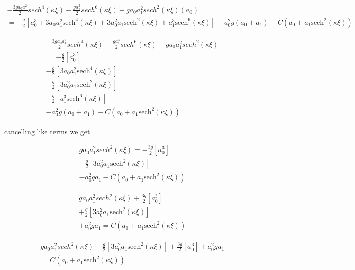 \documentclass[subeqn]{article}
\begin{document}
\begin{multline*}
- \frac{3ga_0a_1^2 }{2} sech^4(\kappa \xi)
- \frac{ga_1^3 }{2} sech^6(\kappa \xi) 
+ ga_0a_1^2  sech^2(\kappa \xi) \left(a_0 \right)\\
= {-\frac{g}{2} \left[a_0^3 + 3a_0a_1^2\text{sech}^4\left( \kappa \xi\right) + 3a_0^2a_1\text{sech}^2\left( \kappa \xi\right) + a_1^3\text{sech}^6\left( \kappa \xi\right)   \right] - a_0^2 g \left(a_0 + a_1\right) - C \left(a_0 + a_1\text{sech}^2\left( \kappa \xi\right) \right)}
\end{multline*}

\begin{multline*}
- \frac{3ga_0a_1^2 }{2} sech^4(\kappa \xi)
- \frac{ga_1^3 }{2} sech^6(\kappa \xi) 
+ ga_0a_1^2  sech^2(\kappa \xi) \\
= -\frac{g}{2} \left[a_0^3   \right] \\
-\frac{g}{2} \left[ 3a_0a_1^2\text{sech}^4\left( \kappa \xi\right) \right] \\
-\frac{g}{2} \left[3a_0^2a_1\text{sech}^2\left( \kappa \xi\right) \right] \\
-\frac{g}{2} \left[ a_1^3\text{sech}^6\left( \kappa \xi\right)   \right] \\
 - a_0^2 g \left(a_0 + a_1\right) - C \left(a_0 + a_1\text{sech}^2\left( \kappa \xi\right) \right)
\end{multline*}

cancelling like terms we get

\begin{multline*}
ga_0a_1^2  sech^2(\kappa \xi) = -\frac{3g}{2} \left[a_0^3   \right] \\
-\frac{g}{2} \left[3a_0^2a_1\text{sech}^2\left( \kappa \xi\right) \right] \\
- a_0^2 g a_1 - C \left(a_0 + a_1\text{sech}^2\left( \kappa \xi\right) \right)
\end{multline*}

\begin{multline*}
ga_0a_1^2  sech^2(\kappa \xi)  +\frac{3g}{2} \left[a_0^3   \right] \\
+\frac{g}{2} \left[3a_0^2a_1\text{sech}^2\left( \kappa \xi\right) \right] \\
+ a_0^2 g a_1  =  C \left(a_0 + a_1\text{sech}^2\left( \kappa \xi\right) \right)
\end{multline*}

\begin{multline*}
ga_0a_1^2  sech^2(\kappa \xi) +\frac{g}{2} \left[3a_0^2a_1\text{sech}^2\left( \kappa \xi\right) \right]   +\frac{3g}{2} \left[a_0^3   \right]+ a_0^2 g a_1  \\=  C \left(a_0 + a_1\text{sech}^2\left( \kappa \xi\right) \right)
\end{multline*}
\end{document}
